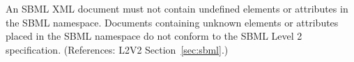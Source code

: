 An SBML XML document must not contain undefined elements or
attributes in the SBML namespace.  Documents containing unknown
elements or attributes placed in the SBML namespace do not conform
to the SBML Level 2 specification.  (References: L2V2
Section~\ref{sec:sbml}.)
